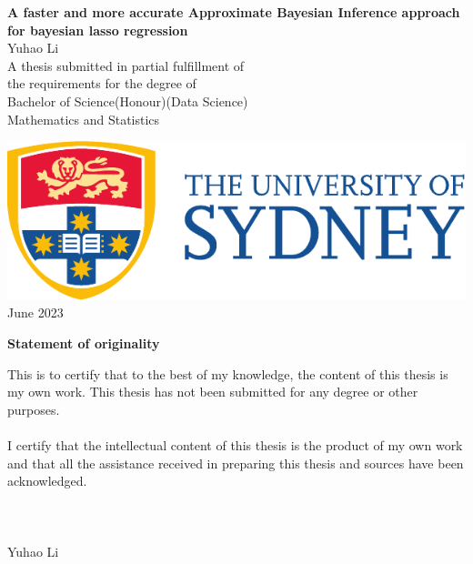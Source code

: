 \begin{titlepage}
\centering
{}
\vspace*{\fill}
\huge{\textbf{{\bf\Huge A faster and more accurate Approximate Bayesian Inference approach for bayesian lasso regression}}}\\



\vspace{2.5cm}
\LARGE{Yuhao Li}\\
\vspace{1.5cm}
\large{A thesis submitted in partial fulfillment of \\ the requirements for the degree of \\  Bachelor of Science(Honour)(Data Science)} \\
\vspace{1cm}
\large{Mathematics and Statistics}\\
\vspace{1.5cm}
\date{September 2021}
    \includegraphics[scale=0.75]{UsydLogo.pdf}\\
\vspace{1.5cm}
\large{June 2023}\\
\vspace*{\fill}

\thispagestyle{empty}
\end{titlepage}



\pagebreak
\hspace{0pt}
\begin{center}
    \textbf{\large Statement of originality}\\
    \vspace{0.5cm}
\end{center}

\noindent This is to certify that to the best of my knowledge, the content of this thesis is my own work. This thesis has not been submitted for any degree or other purposes.\\
\\
\noindent I certify that the intellectual content of this thesis is the product of my own work and that all the assistance received in preparing this thesis and sources have been acknowledged.\\
\\
\\
\\
Yuhao Li

